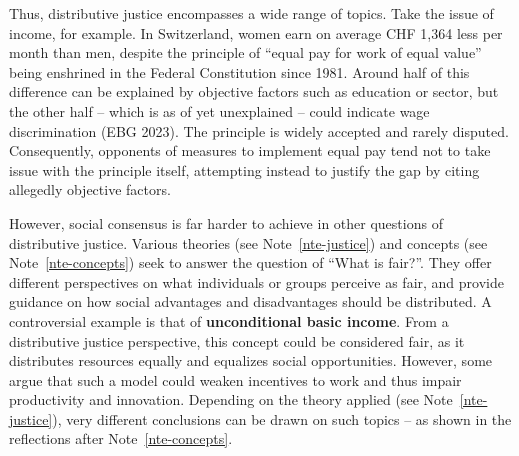 \documentclass[
  a4paper,
  DIV=11,
  numbers=noendperiod,
  oneside,
  openany]{scrreprt}
\begin{document}
Thus, distributive justice encompasses a wide range of topics. Take the
issue of income, for example. In Switzerland, women earn on average CHF
1,364 less per month than men, despite the principle of ``equal pay for
work of equal value'' being enshrined in the Federal Constitution since
1981. Around half of this difference can be explained by objective
factors such as education or sector, but the other half -- which is as
of yet unexplained -- could indicate wage discrimination (EBG 2023). The
principle is widely accepted and rarely disputed. Consequently,
opponents of measures to implement equal pay tend not to take issue with
the principle itself, attempting instead to justify the gap by citing
allegedly objective factors.

However, social consensus is far harder to achieve in other questions of
distributive justice. Various theories (see Note~\ref{nte-justice}) and
concepts (see Note~\ref{nte-concepts}) seek to answer the question of
``What is fair?''. They offer different perspectives on what individuals
or groups perceive as fair, and provide guidance on how social
advantages and disadvantages should be distributed. A controversial
example is that of \textbf{unconditional basic income}. From a
distributive justice perspective, this concept could be considered fair,
as it distributes resources equally and equalizes social opportunities.
However, some argue that such a model could weaken incentives to work
and thus impair productivity and innovation. Depending on the theory
applied (see Note~\ref{nte-justice}), very different conclusions can be
drawn on such topics -- as shown in the reflections after
Note~\ref{nte-concepts}.
\end{document}
